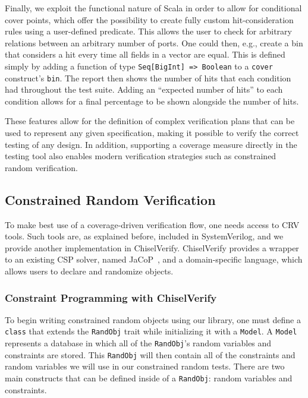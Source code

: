\documentclass[conference]{IEEEtran}
\begin{document}
Finally, we exploit the functional nature of Scala in order to allow for conditional cover points, which offer the possibility to create fully custom hit-consideration rules using a user-defined predicate. 
This allows the user to check for arbitrary relations between an arbitrary number of ports. 
One could then, e.g., create a bin that considers a hit every time all fields in a vector are equal. 
This is defined simply by adding a function of type \texttt{Seq[BigInt] => Boolean} to a \texttt{cover} construct's \texttt{bin}.
The report then shows the number of hits that each condition had throughout the test suite.
Adding an ``expected number of hits'' to each condition allows for a final percentage to be shown alongside the number of hits.

These features allow for the definition of complex verification plans that can be used to represent any given specification, making it possible to verify the correct testing of any design.
In addition, supporting a coverage measure directly in the testing tool also enables modern verification strategies such as constrained random verification.

\subsection{Constrained Random Verification}

To make best use of a coverage-driven verification flow, one needs access to CRV tools. 
Such tools are, as explained before, included in SystemVerilog, and we provide another implementation in ChiselVerify. 
ChiselVerify provides a wrapper to an existing CSP solver, named JaCoP~\cite{jacop2013}, and a domain-specific language, which allows users to declare and randomize objects.

\subsubsection{Constraint Programming with ChiselVerify}
To begin writing constrained random objects using our library, one must define a \texttt{class} that extends the \texttt{RandObj} trait while initializing it with a \texttt{Model}. 
A \texttt{Model} represents a database in which all of the \texttt{RandObj}'s random variables and constraints are stored. 
This \texttt{RandObj} will then contain all of the constraints and random variables we will use in our constrained random tests. 
There are two main constructs that can be defined inside of a \texttt{RandObj}: random variables and constraints.
\end{document}

